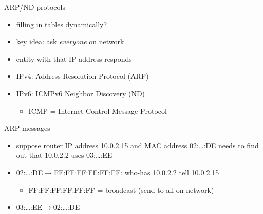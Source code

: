 \begin{frame}{ARP/ND protocols}
    \begin{itemize}
    \item filling in tables dynamically?
    \item key idea: ask \textit{everyone} on network
    \item entity with that IP address responds
    \vspace{.5cm}
    \item IPv4: Address Resolution Protocol (ARP)
    \item IPv6: ICMPv6 Neighbor Discovery (ND)
        \begin{itemize}
        \item ICMP = Internet Control Message Protocol
        \end{itemize}
    \end{itemize}
\end{frame}

\begin{frame}{ARP messages}
\begin{itemize}
\item suppose router IP address 10.0.2.15 and MAC address 02:\ldots:DE needs to find out
    that 10.0.2.2 uses 03:\ldots:EE
\vspace{,5cm}
\item 02:\ldots:DE$\rightarrow$FF:FF:FF:FF:FF:FF: who-has 10.0.2.2 tell 10.0.2.15
    \begin{itemize}
    \item FF:FF:FF:FF:FF:FF = broadcast (send to all on network)
    \end{itemize}
\item 03:\ldots:EE$\rightarrow$02:\ldots:DE
\end{itemize}
\end{frame}
